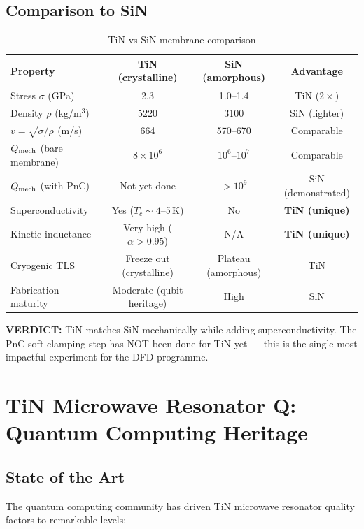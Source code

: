 \documentclass[11pt]{article}
\theoremstyle{remark}
\newcommand{\ee}[1]{\times 10^{#1}}
\newcommand{\verdict}[1]{\textcolor{green!50!black}{\textbf{VERDICT:} #1}}
\begin{document}
\subsection{Comparison to SiN}

\begin{table}[H]
\centering
\caption{TiN vs SiN membrane comparison}
\begin{tabular}{@{}lccc@{}}
\toprule
Property & TiN (crystalline) & SiN (amorphous) & Advantage \\
\midrule
Stress $\sigma$ (GPa) & 2.3 & 1.0--1.4 & TiN ($2\times$) \\
Density $\rho$ (kg/m$^3$) & 5220 & 3100 & SiN (lighter) \\
$v = \sqrt{\sigma/\rho}$ (m/s) & 664 & 570--670 & Comparable \\
$Q_{\rm mech}$ (bare membrane) & $8\ee{6}$ & $10^6$--$10^7$ & Comparable \\
$Q_{\rm mech}$ (with PnC) & Not yet done & $> 10^9$ & SiN (demonstrated) \\
Superconductivity & Yes ($T_c \sim 4$--5\,K) & No & \textbf{TiN (unique)} \\
Kinetic inductance & Very high ($\alpha > 0.95$) & N/A & \textbf{TiN (unique)} \\
Cryogenic TLS & Freeze out (crystalline) & Plateau (amorphous) & TiN \\
Fabrication maturity & Moderate (qubit heritage) & High & SiN \\
\bottomrule
\end{tabular}
\end{table}

\verdict{TiN matches SiN mechanically while adding superconductivity.
The PnC soft-clamping step has NOT been done for TiN yet --- this is
the single most impactful experiment for the DFD programme.}


\section{TiN Microwave Resonator Q: Quantum Computing Heritage}
\label{sec:microwave}

\subsection{State of the Art}

The quantum computing community has driven TiN microwave resonator
quality factors to remarkable levels:
\end{document}

